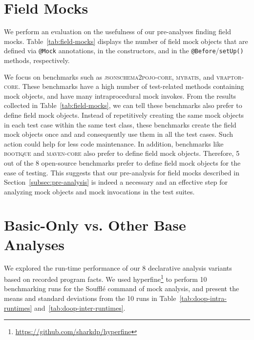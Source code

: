 
\section{Field Mocks}

We perform an evaluation on the usefulness of our pre-analyses finding field mocks. 
Table~\ref{tab:field-mocks} displays the number of field mock objects that are defined via \texttt{@Mock} annotations, in the constructors, and in the \texttt{@Before}/\texttt{setUp()} methods, respectively. 

We focus on benchmarks such as \textsc{jsonschema2pojo-core}, \textsc{mybatis}, and \textsc{vraptor-core}. These benchmarks have a high number of test-related methods containing mock objects, and have many intraprocedural mock invokes. From the results collected in Table~\ref{tab:field-mocks}, we can tell these benchmarks also prefer to define field mock objects. Instead of repetitively creating the same mock objects in each test case within the same test class, these benchmarks create the field mock objects once and and consequently use them in all the test cases. Such action could help for less code maintenance. In addition, benchmarks like \textsc{bootique} and \textsc{maven-core} also prefer to define field mock objects. Therefore, 5 out of the 8 open-source benchmarks prefer to define field mock objects for the ease of testing. This suggests that our pre-analysis for field mocks described in Section~\ref{subsec:pre-analysis} is indeed a necessary and an effective step for analyzing mock objects and mock invocations in the test suites.


\section{Basic-Only vs. Other Base Analyses}

We explored the run-time performance of our 8 declarative analysis variants based on recorded program facts. We used hyperfine\footnote{\url{https://github.com/sharkdp/hyperfine}} to perform 10 benchmarking runs for the Soufflé command of mock analysis, and present the means and standard deviations from the 10 runs in Table~\ref{tab:doop-intra-runtimes} and~\ref{tab:doop-inter-runtimes}.

